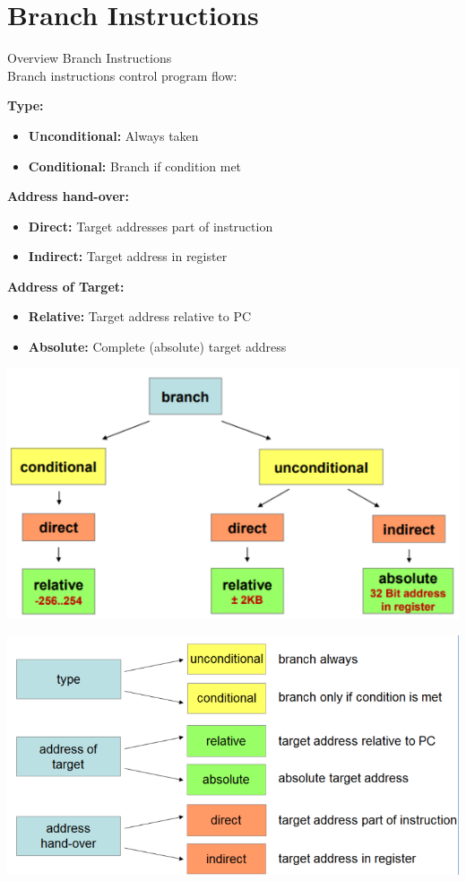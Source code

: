 \section{Branch Instructions}

\begin{concept}{Overview Branch Instructions}\\
Branch instructions control program flow:

\textcolor{darkcorn}{\textbf{Type:}}
\begin{itemize}
  \item \textbf{Unconditional:} Always taken
  \item \textbf{Conditional:} Branch if condition met
\end{itemize}

\textcolor{darktangerine}{\textbf{Address hand-over:}}
\begin{itemize}
  \item \textbf{Direct:} Target addresses part of instruction
  \item \textbf{Indirect:} Target address in register
\end{itemize}

\textcolor{darkfrog}{\textbf{Address of Target:}}
\begin{itemize}
  \item \textbf{Relative:} Target address relative to PC
  \item \textbf{Absolute:} Complete (absolute) target address
\end{itemize}

\includegraphics[width=\linewidth]{images/overview_branches.png}

\includegraphics[width=\linewidth]{images/branchoverview2.png}
\end{concept}

